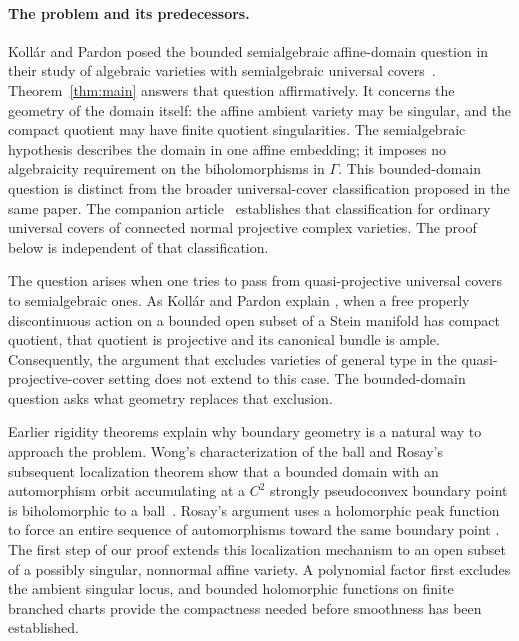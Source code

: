 \documentclass[11pt]{article}
\numberwithin{equation}{section}
\theoremstyle{definition}
\theoremstyle{remark}
\begin{document}
\paragraph{The problem and its predecessors.}
Koll\'ar and Pardon posed the bounded semialgebraic affine-domain question
in their study of algebraic varieties with semialgebraic universal
covers~\cite[arXiv version~2, Question~25]{KP2012}. Theorem~\ref{thm:main} answers that
question affirmatively. It concerns the geometry of the domain itself:
the affine ambient variety may be singular, and the compact quotient may
have finite quotient singularities. The semialgebraic hypothesis describes
the domain in one affine embedding; it imposes no algebraicity requirement
on the biholomorphisms in $\Gamma$. This bounded-domain question is distinct
from the broader universal-cover classification proposed in the same paper.
The companion article~\cite[Theorem~1.1]{OpenAISemialgebraicCovers2026}
establishes that classification for ordinary universal covers of connected
normal projective complex varieties. The proof below is independent of
that classification.

The question arises when one tries to pass from quasi-projective universal
covers to semialgebraic ones. As Koll\'ar and Pardon explain
\cite[arXiv version~2, Section~3, p.~13]{KP2012}, when a free properly
discontinuous action on a bounded open subset of a Stein manifold has
compact quotient, that quotient is projective and its canonical bundle
is ample. Consequently, the argument that excludes varieties of general
type in the quasi-projective-cover setting does not extend to this case.
The bounded-domain question asks what geometry replaces that exclusion.

Earlier rigidity theorems explain why boundary geometry is a natural way
to approach the problem. Wong's characterization of the ball and Rosay's
subsequent localization theorem show that a bounded domain with an
automorphism orbit accumulating at a $C^2$ strongly pseudoconvex boundary
point is biholomorphic to a ball~\cite{Wong1977,Rosay1979}. Rosay's argument
uses a holomorphic peak function to force an entire sequence of
automorphisms toward the same boundary point
\cite[Section~3, Lemma~2]{Rosay1979}. The first step of our proof extends
this localization mechanism to an open subset of a possibly singular,
nonnormal affine variety. A polynomial factor first excludes the ambient
singular locus, and bounded holomorphic functions on finite branched charts
provide the compactness needed before smoothness has been established.
\end{document}
